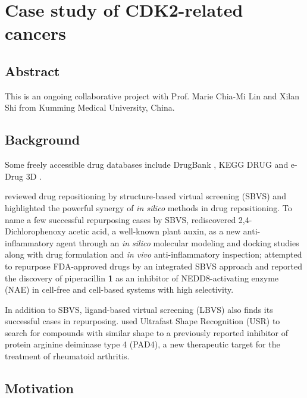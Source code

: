 \chapter{Case study of CDK2-related cancers}
\label{cdk2}

\section{Abstract}

This is an ongoing collaborative project with Prof. Marie Chia-Mi Lin and Xilan Shi from Kumming Medical University, China.

\section{Background}

Some freely accessible drug databases include DrugBank \citep{1594}, KEGG DRUG \citep{1595} and e-Drug 3D \citep{1125}.

\citep{1384} reviewed drug repositioning by structure-based virtual screening (SBVS) and highlighted the powerful synergy of \textit{in silico} methods in drug repositioning. To name a few successful repurposing cases by SBVS, \citep{1507} rediscovered 2,4-Dichlorophenoxy acetic acid, a well-known plant auxin, as a new anti-inflammatory agent through an \textit{in silico} molecular modeling and docking studies along with drug formulation and \textit{in vivo} anti-inflammatory inspection; \citep{1506} attempted to repurpose FDA-approved drugs by an integrated SBVS approach and reported the discovery of piperacillin \textbf{1} as an inhibitor of NEDD8-activating enzyme (NAE) in cell-free and cell-based systems with high selectivity.

In addition to SBVS, ligand-based virtual screening (LBVS) also finds its successful cases in repurposing. \citep{1504} used Ultrafast Shape Recognition (USR) \citep{1379} to search for compounds with similar shape to a previously reported inhibitor of protein arginine deiminase type 4 (PAD4), a new therapeutic target for the treatment of rheumatoid arthritis.


\section{Motivation}



